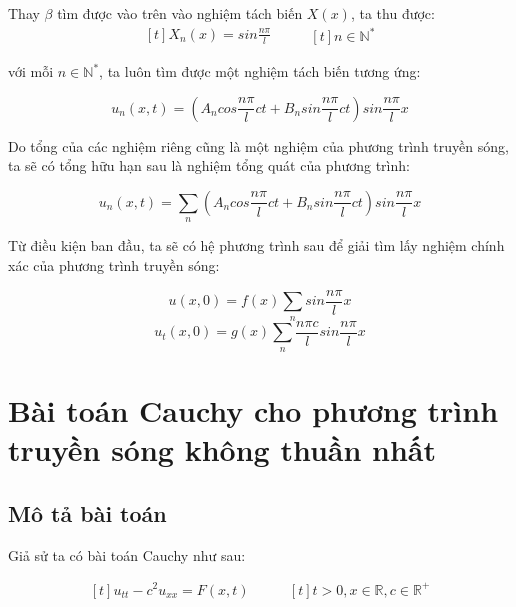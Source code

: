 \documentclass[a4paper]{article}
\begin{document}
Thay $\beta$ tìm được vào trên vào nghiệm tách biến $X(x)$, ta thu được:
\begin{equation*}
\begin{aligned}[t]
X_n(x) = sin\frac{n\pi}{l}
\end{aligned}
\qquad
\begin{aligned}[t]
n \in \mathbb{N}^*
\end{aligned}
\end{equation*}

với mỗi $n \in \mathbb{N}^*$, ta luôn tìm được một nghiệm tách biến tương ứng:

\begin{equation*}
    u_n(x,t) = (A_ncos\frac{n\pi}{l}ct + B_nsin\frac{n\pi}{l}ct)sin\frac{n\pi}{l}x
\end{equation*}

Do tổng của các nghiệm riêng cũng là một nghiệm của phương trình truyền sóng, ta sẽ có tổng hữu hạn sau là nghiệm tổng quát của phương trình:

\begin{equation*}
    u_n(x,t) = \sum_{n}^{}(A_ncos\frac{n\pi}{l}ct + B_nsin\frac{n\pi}{l}ct)sin\frac{n\pi}{l}x
\end{equation*}

Từ điều kiện ban đầu, ta sẽ có hệ phương trình sau để giải tìm lấy nghiệm chính xác của phương trình truyền sóng:

\begin{equation*}
u(x, 0) = f(x) \sum_{n}^{}sin\frac{n\pi}{l}x    
\end{equation*}
\begin{equation*}
u_t(x, 0) = g(x) \sum_{n}^{}\frac{n\pi c}{l}sin\frac{n\pi}{l}x    
\end{equation*}


\section{Bài toán Cauchy cho phương trình truyền sóng không thuần nhất}
\subsection{Mô tả bài toán}

Giả sử ta có bài toán Cauchy như sau:

\begin{equation*}
\begin{aligned}[t]
u_{tt} - c^2u_{xx} = F(x,t)
\end{aligned}
\qquad
\begin{aligned}[t]
t > 0, x \in \mathbb{R}, c \in \mathbb{R}^+
\end{aligned}
\end{equation*}
\end{document}

